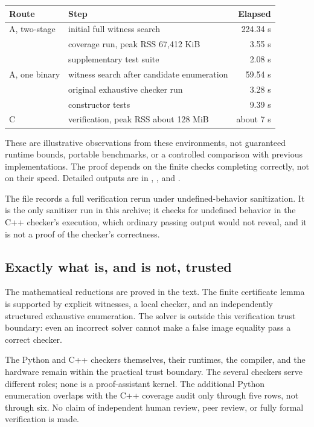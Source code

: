 \documentclass[11pt,letterpaper]{article}
\numberwithin{equation}{section}
\theoremstyle{definition}
\theoremstyle{remark}
\newcommand{\code}[1]{\texttt{\detokenize{#1}}}
\newcommand{\dbA}{\textsf{A}}
\newcommand{\dbC}{\textsf{C}}
\begin{document}
\begin{center}
\small
\begin{tabular}{@{}llr@{}}
\toprule
Route & Step & Elapsed\\
\midrule
\dbA{}, two-stage & initial full witness search & 224.34 s\\
                  & coverage run, peak RSS 67,412 KiB & 3.55 s\\
                  & supplementary test suite & 2.08 s\\
\dbA{}, one binary & witness search after candidate enumeration & 59.54 s\\
                  & original exhaustive checker run & 3.28 s\\
                  & constructor tests & 9.39 s\\
\dbC{}            & verification, peak RSS about 128 MiB & about 7 s\\
\bottomrule
\end{tabular}
\end{center}

These are illustrative observations from these environments, not guaranteed
runtime bounds, portable benchmarks, or a controlled comparison with previous
implementations. The proof depends on the finite checks completing correctly,
not on their speed. Detailed outputs are in \code{audit/},
\code{audit/theorem/}, \code{logs/} and \code{residual/}.

The file  records a full verification rerun
under undefined-behavior sanitization. It is the only sanitizer run in this
archive; it checks for undefined behavior in the C++ checker's execution,
which ordinary passing output would not reveal, and it is not a proof of the
checker's correctness.

\subsection{Exactly what is, and is not, trusted}
The mathematical reductions are proved in the text. The finite
certificate lemma is supported by explicit witnesses, a local checker,
and an independently structured exhaustive enumeration. The solver is
outside this verification trust boundary: even an incorrect solver cannot
make a false image equality pass a correct checker.

The Python and C++ checkers themselves, their runtimes, the compiler, and
the hardware remain within the practical trust boundary. The several checkers
serve different roles; none is a proof-assistant kernel. The additional
Python enumeration overlaps with the C++ coverage audit only through five
rows, not through six. No claim of independent human review, peer review,
or fully formal verification is made.
\end{document}
